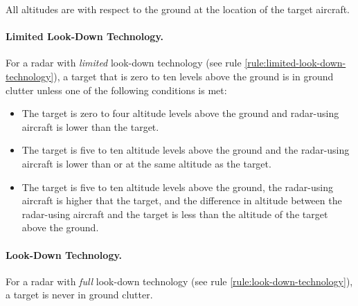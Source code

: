 {\begin{itemize}
    \end{itemize}

All altitudes are with respect to the ground at the location of the target aircraft.

\paragraph{Limited Look-Down Technology.} For a radar with \emph{limited} look-down technology (see rule \ref{rule:limited-look-down-technology}), a target that is zero to ten levels above the ground is in ground clutter unless one of the following conditions is met:

    \begin{itemize}

        \item The target is zero to four altitude levels above the ground and radar-using aircraft is lower than the target.

        \item The target is five to ten altitude levels above the ground and the radar-using aircraft is lower than or at the same altitude as the target.

        \item The target is five to ten altitude levels above the ground, the radar-using aircraft is higher that the target, and the difference in altitude between the radar-using aircraft and the target is less than the altitude of the target above the ground.

    \end{itemize}

\paragraph{Look-Down Technology.} For a radar with \emph{full} look-down technology (see rule \ref{rule:look-down-technology}), a target is never in ground clutter.
    
}




